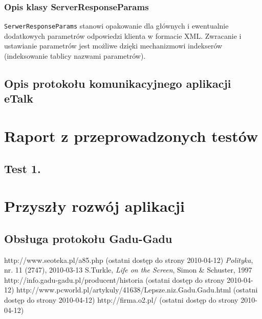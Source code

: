 \documentclass[a4paper,12pt]{article}
\begin{document}
\subsubsection[Opis klasy ServerResponseParams]{Opis klasy ServerResponseParams}
\texttt{SerwerResponseParams} stanowi opakowanie dla głównych i ewentualnie dodatkowych parametrów odpowiedzi klienta w formacie XML. Zwracanie i ustawianie parametrów jest możliwe dzięki mechanizmowi indekserów (indeksowanie tablicy nazwami parametrów).

\subsection[Opis protokołu komunikacyjnego aplikacji eTalk]{Opis protokołu komunikacyjnego aplikacji eTalk}

\section[Raport z przeprowadzonych testów]{Raport z przeprowadzonych testów}
\subsection[Test 1.]{Test 1.}


\section[Przyszły rozwój aplikacji]{Przyszły rozwój aplikacji}
\subsection[Obsługa protokołu Gadu-Gadu]{Obsługa protokołu Gadu-Gadu}


\begin{thebibliography}{9}
 http://www.seoteka.pl/a85.php (ostatni dostęp do strony 2010-04-12)
 \emph{Polityka}, nr. 11 (2747), 2010-03-13
 S.Turkle, \emph{Life on the Screen}, Simon \& Schuster, 1997
 http://info.gadu-gadu.pl/producent/historia (ostatni dostęp do strony 2010-04-12)
 http://www.pcworld.pl/artykuly/41638/Lepsze.niz.Gadu.Gadu.html (ostatni dostęp do strony 2010-04-12)
 http://firma.o2.pl/ (ostatni dostęp do strony 2010-04-12)
\end{thebibliography}
\end{document}
